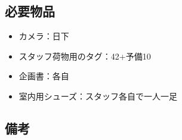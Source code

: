 
\subsection{必要物品}
\begin{itemize}
\item カメラ：日下
\item スタッフ荷物用のタグ：42+予備10
\item 企画書：各自
\item 室内用シューズ：スタッフ各自で一人一足
\end{itemize}

\subsection{備考}

%
